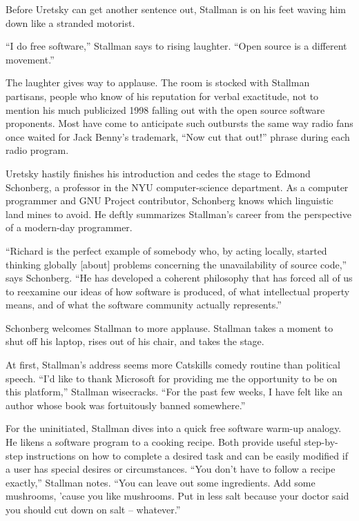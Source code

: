 Before Uretsky can get another sentence out, Stallman is on his feet waving him down like a stranded motorist.

``I do free software,'' Stallman says to rising laughter. ``Open source is a different movement.''

The laughter gives way to applause. The room is stocked with Stallman partisans, people who know of his reputation for verbal exactitude, not to mention his much publicized 1998 falling out with the open source software proponents. Most have come to anticipate such outbursts the same way radio fans once waited for Jack Benny's trademark, ``Now cut that out!'' phrase during each radio program.

Uretsky hastily finishes his introduction and cedes the stage to Edmond Schonberg, a professor in the NYU computer-science department. As a computer programmer and GNU Project contributor, Schonberg knows which linguistic land mines to avoid. He deftly summarizes Stallman's career from the perspective of a modern-day programmer.

``Richard is the perfect example of somebody who, by acting locally, started thinking globally [about] problems concerning the unavailability of source code,'' says Schonberg. ``He has developed a coherent philosophy that has forced all of us to reexamine our ideas of how software is produced, of what intellectual property means, and of what the software community actually represents.''

Schonberg welcomes Stallman to more applause. Stallman takes a moment to shut off his laptop, rises out of his chair, and takes the stage.

At first, Stallman's address seems more Catskills comedy routine than political speech. ``I'd like to thank Microsoft for providing me the opportunity to be on this platform,'' Stallman wisecracks. ``For the past few weeks, I have felt like an author whose book was fortuitously banned somewhere.''

For the uninitiated, Stallman dives into a quick free software warm-up analogy. He likens a software program to a cooking recipe. Both provide useful step-by-step instructions on how to complete a desired task and can be easily modified if a user has special desires or circumstances. ``You don't have to follow a recipe exactly,'' Stallman notes. ``You can leave out some ingredients. Add some mushrooms, 'cause you like mushrooms. Put in less salt because your doctor said you should cut down on salt -- whatever.''

